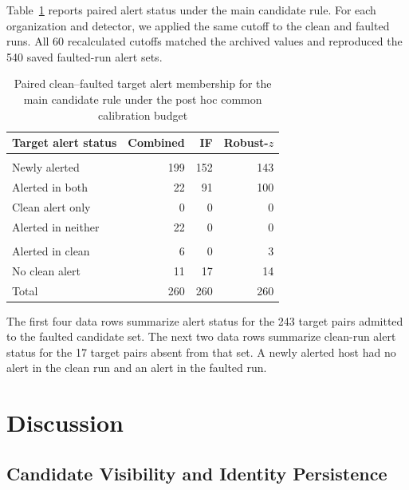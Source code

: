 \documentclass[sn-basic]{sn-jnl}%
\theoremstyle{thmstyleone}%
\theoremstyle{thmstyletwo}%
\theoremstyle{thmstylethree}%
\begin{document}
Table~\ref{tab:paired-alert-membership} reports paired alert status under the main candidate rule. For each organization and detector, we applied the same cutoff to the clean and faulted runs. All 60 recalculated cutoffs matched the archived values and reproduced the 540 saved faulted-run alert sets.

\begin{table}[htbp]
\centering
\caption{Paired clean--faulted target alert membership for the main candidate rule under the post hoc common calibration budget}
\label{tab:paired-alert-membership}
\small
\setlength{\tabcolsep}{3pt}
\renewcommand{\arraystretch}{1.12}
\begin{tabularx}{\linewidth}{@{}>{\raggedright\arraybackslash}Xrrr@{}}
\toprule
Target alert status & Combined & IF & Robust-\(z\) \\
\midrule
\multicolumn{4}{@{}l}{\textit{Admitted to the faulted candidate set}} \\
Newly alerted & 199 & 152 & 143 \\
Alerted in both & 22 & 91 & 100 \\
Clean alert only & 0 & 0 & 0 \\
Alerted in neither & 22 & 0 & 0 \\
\addlinespace
\multicolumn{4}{@{}l}{\textit{Absent from the faulted candidate set}} \\
Alerted in clean & 6 & 0 & 3 \\
No clean alert & 11 & 17 & 14 \\
\midrule
Total & 260 & 260 & 260 \\
\bottomrule
\end{tabularx}
\end{table}

The first four data rows summarize alert status for the 243 target pairs admitted to the faulted candidate set. The next two data rows summarize clean-run alert status for the 17 target pairs absent from that set. A newly alerted host had no alert in the clean run and an alert in the faulted run.

\section{Discussion}\label{sec:discussion}

\subsection{Candidate Visibility and Identity Persistence}
\label{sec:identity-persistence}
\end{document}
